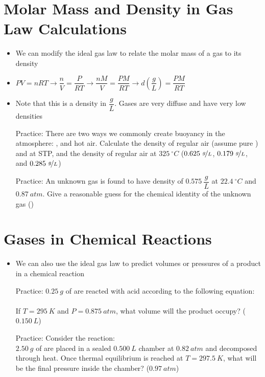 \documentclass[12pt, openany, letterpaper]{memoir}
\begin{document}
\section{Molar Mass and Density in Gas Law Calculations}
\begin{itemize}
	\item We can modify the ideal gas law to relate the molar mass of a gas to its density
	\item $PV=nRT \rightarrow \dfrac{n}{V}=\dfrac{P}{RT} \rightarrow \dfrac{nM}{V} = \dfrac{PM}{RT} \rightarrow d\left(\dfrac{g}{L}\right)=\dfrac{PM}{RT}$
	\item Note that this is a density in $\dfrac{g}{L}$. Gases are very diffuse and have very low densities

	      Practice: There are two ways we commonly create buoyancy in the atmosphere: , and hot air. Calculate the density of regular air (assume pure ) and  at STP, and the density of regular air at $325~^\circ C$ ($0.625~\nicefrac{g}{L}$, $0.179~\nicefrac{g}{L}$, and $0.285~\nicefrac{g}{L}$)

	      Practice: An unknown gas is found to have density of $0.575~\dfrac{g}{L}$ at $22.4~^\circ C$ and $0.87~atm$. Give a reasonable guess for the chemical identity of the unknown gas ()

\end{itemize}
\section{Gases in Chemical Reactions}
\begin{itemize}
	\item We can also use the ideal gas law to predict volumes or pressures of a product in a chemical reaction

	      Practice: $0.25~g$ of  are reacted with acid according to the following equation:\\
	      \\
	      If $T=295~K$ and $P=0.875~atm$, what volume will the  product occupy? ($0.150~L$)

	      Practice: Consider the reaction: \\
	      $2.50~g$ of  are placed in a sealed $0.500~L$ chamber at $0.82~atm$ and decomposed through heat. Once thermal equilibrium is reached at $T=297.5~K$, what will be the final pressure inside the chamber? ($0.97~atm$)
\end{itemize}
\end{document}
